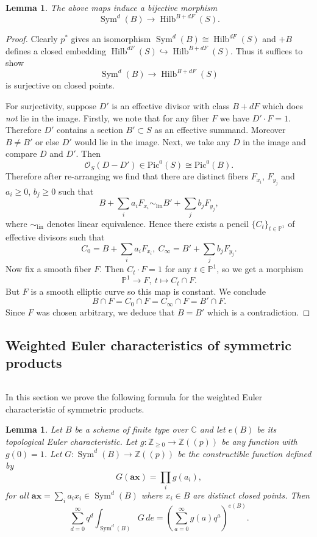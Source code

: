 \documentclass[12pt]{amsart}
\newtheorem{lemma}[theorem]{Lemma}
\theoremstyle{definition}
\newcommand{\CC} {\mathbb{C}}          %
\newcommand{\ZZ} {\mathbb{Z}}		%
\newcommand{\PP} {\mathbb{P}}
\renewcommand{\O}{\mathcal{O}}
\newcommand{\Pic}{\mathrm{Pic}}
\newcommand{\Sym}{\operatorname{Sym}}
\newcommand{\Hilb}{\operatorname{Hilb}}
\newcommand{\boldx}{\boldsymbol{x}}
\newcommand{\bolda}{\boldsymbol{a}}
\newcommand{\SubSecSpace}{$\,$\vspace{0.2cm}\par } %
\begin{document}
\begin{lemma} \label{lem: Sym(B) = Hilb(S)}
The above maps induce a bijective morphism
$$
\Sym^d(B) \to  \Hilb^{B+dF}(S).
$$
\end{lemma}

\begin{proof}
Clearly $p^*$ gives an isomorphism $\Sym^d(B) \cong \Hilb^{dF}(S)$ and
$+B$ defines a closed embedding $\Hilb^{dF}(S) \hookrightarrow
\Hilb^{B+dF}(S)$. Thus it suffices
to show
$$
\Sym^d(B) \rightarrow \Hilb^{B+dF}(S)
$$ 
is surjective on closed points.

For surjectivity, suppose $D'$ is an effective divisor with class
$B+dF$ which does \emph{not} lie in the image. Firstly, we note that
for any fiber $F$ we have $D' \cdot F = 1$. Therefore $D'$ contains a
section $B' \subset S$ as an effective summand. Moreover $B \neq B'$
or else $D'$ would lie in the image. Next, we take any $D$ in the
image and compare $D$ and $D'$. Then
$$
\O_S(D-D') \in \Pic^0(S) \cong \Pic^0(B).
$$ 
Therefore after re-arranging we find that there are distinct fibers $F_{x_i}$, $F_{y_j}$ and $a_i \geq 0$, $b_j \geq 0$ such that 
$$
B + \sum_i a_i F_{x_i} \sim_{\mathrm{lin}} B' + \sum_j b_j F_{y_j},
$$
where $\sim_{\mathrm{lin}}$ denotes linear equivalence. Hence there exists a pencil $\{C_t \}_{t \in \PP^1}$ of effective divisors such that
$$
C_0 = B + \sum_i a_i F_{x_i}, \ C_{\infty} = B' + \sum_j b_j F_{y_j}.
$$
Now fix a smooth fiber $F$. Then $C_t \cdot F = 1$ for any $t \in \PP^1$, so we get a morphism
$$
\PP^1 \longrightarrow F, \ t \mapsto C_t \cap F.
$$
But $F$ is a smooth elliptic curve so this map is constant. We conclude
$$
B \cap F = C_0 \cap F = C_{\infty} \cap F = B' \cap F.
$$
Since $F$ was chosen arbitrary, we deduce that $B = B'$ which is a contradiction.
\end{proof}


\subsection{Weighted Euler characteristics of symmetric products} \label{power}\SubSecSpace 

In this section we prove the following formula for the weighted Euler
characteristic of symmetric products.

\begin{lemma}\label{lem: formula for euler char of sym products}
Let $B$ be a scheme of finite type over $\CC $ and let $e (B)$ be its
topological Euler characteristic. Let $g:\ZZ _{\geq 0}\to \ZZ
(\!(p)\!)$ be any function with $g (0)=1$. Let $G:\Sym ^{d} (B)\to \ZZ
(\!(p)\!)$ be the constructible function defined by
\[
G (\bolda \boldx )=\prod _{i}g (a_{i}),
\]
for all $\bolda \boldx  = \sum_{i}
a_{i}x_{i} \in \Sym^d(B)$ where $x_i \in B$ are distinct closed points. Then
\[
\sum _{d=0}^{\infty } q^{d} \int _{\Sym ^{d} (B)} G \, de =
\left(\sum _{a=0}^{\infty }g (a) q^{a} \right)^{e (B)}.
\]
\end{lemma}
\end{document}
